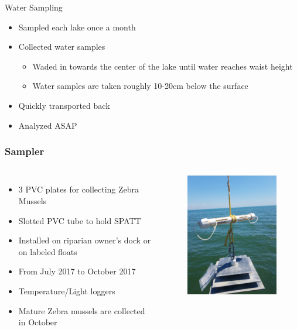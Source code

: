 \begin{frame}{Water Sampling}

	\begin{itemize}
		\item Sampled each lake once a month
		\item Collected water samples
			\begin{itemize}
				\item Waded in towards the center of the lake until water reaches waist height
				\item Water samples are taken roughly 10-20cm below the surface
			\end{itemize}
		\item Quickly transported back
		\item Analyzed ASAP
	\end{itemize}

\end{frame}
\begin{frame}
	\frametitle{Sampler}
\begin{columns}
	\begin{itemize}
		\item 3 PVC plates for collecting Zebra Mussels 
		\item Slotted PVC tube to hold SPATT 
		\item Installed on riparian owner's dock or on labeled floats  
		\item From July 2017 to October 2017
		\item Temperature/Light loggers 
		\item Mature Zebra mussels are collected in October
	\end{itemize}
	\begin{figure}
		\includegraphics[width=2.3in,angle=-90]{sampler.jpg}
	\end{figure}
\end{columns}


\end{frame}



